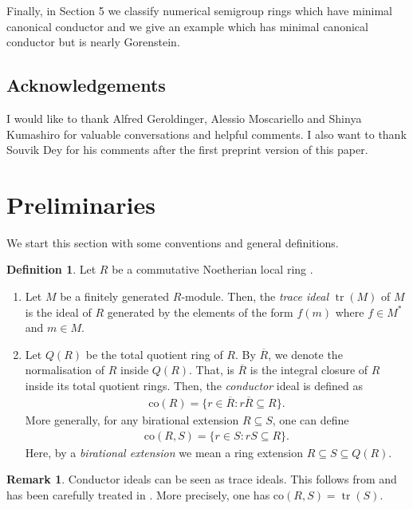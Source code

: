 \documentclass[12pt]{amsart}
\newcommand\co{\mathrm{co}}
\theoremstyle{definition}
\newtheorem{definition}[theorem]{Definition}
\newtheorem{remark}[theorem]{Remark}
\DeclareMathOperator{\tr}{\mathrm{tr}}
\begin{document}
Finally, in Section 5 we classify numerical semigroup rings which have minimal canonical conductor and we give an example which has minimal canonical conductor but is nearly Gorenstein.

\subsection*{Acknowledgements} I would like to thank Alfred Geroldinger, Alessio Moscariello and Shinya Kumashiro for valuable conversations and helpful comments. I also want to thank Souvik Dey for his comments after the first preprint version of this paper.


\section{Preliminaries}
We start this section with some conventions and general definitions. 
\begin{definition}\label{trace-and-conductor}
    Let $R$ be a commutative Noetherian local ring .
     \begin{enumerate}
        \item Let $M$ be a finitely generated $R$-module. Then, the \textit{trace ideal} $\tr(M)$ of $M$ is the ideal of $R$ generated by the elements of the form $f(m)$ where $f \in M^*$ and $m \in M$. 
        \item Let $Q(R)$ be the total quotient ring of $R$. By $\overline{R}$, we denote the normalisation of $R$ inside $Q(R)$. That, is $\overline{R}$ is the integral closure of $R$ inside its total quotient rings. Then, the \textit{conductor} ideal is defined as 
        \begin{align*}
            \co(R) = \{r \in \overline{R} \colon r \overline{R} \subseteq R \}.
        \end{align*}
        More generally, for any birational extension $R \subseteq S$, one can define 
        \begin{align*}
            \co(R,S) = \{r \in S \colon r S \subseteq R \}.
        \end{align*}
        Here, by a \textit{birational extension} we mean a ring extension $R \subseteq S \subseteq Q(R)$.
     \end{enumerate}
\end{definition}
\begin{remark}\label{trace-conductor-remark}
    Conductor ideals can be seen as trace ideals. This follows from \cite[Proposition 2.4]{Kobayashi-Takahashi-Trace} and has been carefully treated in \cite[Appendix]{Herzog-Hibi-Stamate-semigroup}. More precisely, one has $\co(R,S) = \tr(S)$. 
\end{remark}
\end{document}
